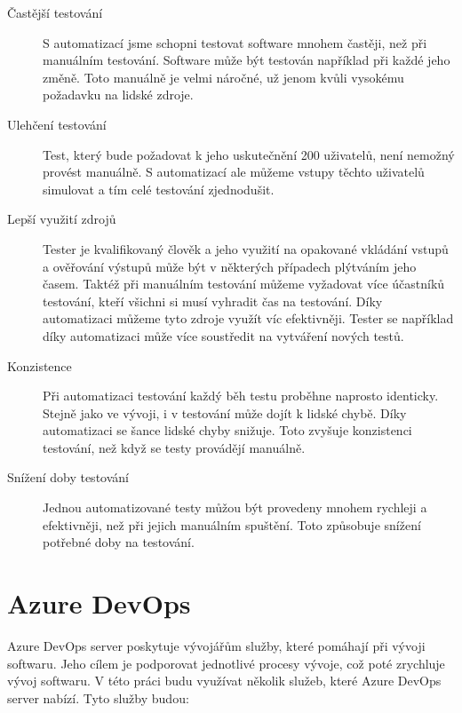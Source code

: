 \begin{description}
    \item[Častější testování] S automatizací jsme schopni testovat software mnohem častěji, než při manuálním testování. Software může být testován například při každé jeho změně. Toto manuálně je velmi náročné, už jenom kvůli vysokému požadavku na lidské zdroje.  
    \item[Ulehčení testování] Test, který bude požadovat k jeho uskutečnění 200 uživatelů, není nemožný provést manuálně. S automatizací ale můžeme vstupy těchto uživatelů simulovat a tím celé testování zjednodušit.  
    \item[Lepší využití zdrojů] Tester je kvalifikovaný člověk a jeho využití na opakované vkládání vstupů a ověřování výstupů může být v některých případech plýtváním jeho časem.
    Taktéž při manuálním testování můžeme vyžadovat více účastníků testování, kteří všichni si musí vyhradit čas na testování. Díky automatizaci můžeme tyto zdroje využít víc efektivněji. Tester se například díky automatizaci může více soustředit na vytváření nových testů.
    \item[Konzistence] Při automatizaci testování každý běh testu proběhne naprosto identicky. Stejně jako ve vývoji, i v testování může dojít k lidské chybě. Díky automatizaci se šance lidské chyby snižuje. Toto zvyšuje konzistenci testování, než když se testy provádějí manuálně.
    \item[Snížení doby testování] Jednou automatizované testy můžou být provedeny mnohem rychleji a efektivněji, než při jejich manuálním spuštění. Toto způsobuje snížení potřebné doby na testování.
\end{description}

\section{Azure DevOps}

Azure DevOps server poskytuje vývojářům služby, které pomáhají při vývoji softwaru. Jeho cílem je podporovat jednotlivé procesy vývoje, což poté zrychluje vývoj softwaru. \cite{azure_devops} V této práci budu využívat několik služeb, které Azure DevOps server nabízí. Tyto služby budou:

